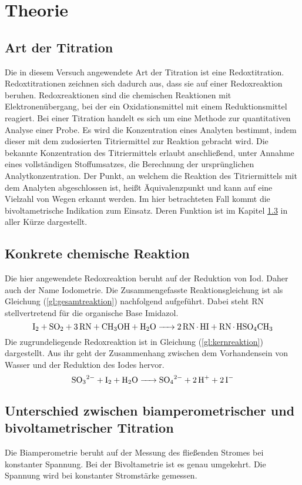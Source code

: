 \section{Theorie}
\label{sec:theorie}

\subsection{Art der Titration}
Die in diesem Versuch angewendete Art der Titration ist eine Redoxtitration. Redoxtitrationen zeichnen sich dadurch aus, dass sie auf einer Redoxreaktion beruhen. Redoxreaktionen sind die chemischen Reaktionen mit Elektronenübergang, bei der ein Oxidationsmittel mit einem Reduktionsmittel reagiert.\cite{redoxreaktion} Bei einer Titration handelt es sich um eine Methode zur quantitativen Analyse einer Probe. Es wird die Konzentration eines Analyten bestimmt, indem dieser mit dem zudosierten Titriermittel zur Reaktion gebracht wird.\cite{titration} Die bekannte Konzentration des Titriermittels erlaubt anschließend, unter Annahme eines vollständigen Stoffumsatzes, die Berechnung der ursprünglichen Analytkonzentration. Der Punkt, an welchem die Reaktion des Titriermittels mit dem Analyten abgeschlossen ist, heißt Äquivalenzpunkt und kann auf eine Vielzahl von Wegen erkannt werden. Im hier betrachteten Fall kommt die bivoltametrische Indikation zum Einsatz. Deren Funktion ist  im Kapitel  \ref{sec:unterschiedBivoltBiamp} in aller Kürze dargestellt.
\subsection{Konkrete chemische Reaktion}
Die hier angewendete Redoxreaktion beruht auf der Reduktion von Iod. Daher auch der Name Iodometrie. Die Zusammengefasste Reaktionsgleichung ist als Gleichung (\ref{gl:gesamtreaktion}) nachfolgend aufgeführt. Dabei steht RN stellvertretend für die organische Base Imidazol. 
\begin{equation}\label{gl:gesamtreaktion}
	\ce{I2 + SO2 + 3 RN + CH3OH + H2O -> 2RN*HI + RN*HSO4CH3}
\end{equation}
Die zugrundeliegende Redoxreaktion ist in Gleichung (\ref{gl:kernreaktion}) dargestellt. Aus ihr geht der Zusammenhang zwischen dem Vorhandensein von Wasser und der Reduktion des Iodes hervor.
\begin{equation}\label{gl:kernreaktion}
	\ce{SO3^2- +I2 +H2O -> SO4^2- + 2H^+ +2I-}
\end{equation}
\subsection{Unterschied zwischen biamperometrischer und bivoltametrischer Titration}\label{sec:unterschiedBivoltBiamp}

Die Biamperometrie beruht auf der Messung des fließenden Stromes bei konstanter Spannung. Bei der Bivoltametrie ist es genau umgekehrt. Die Spannung wird bei konstanter Stromstärke gemessen.\cite{biamperometrie}\cite{bivoltametrie}

